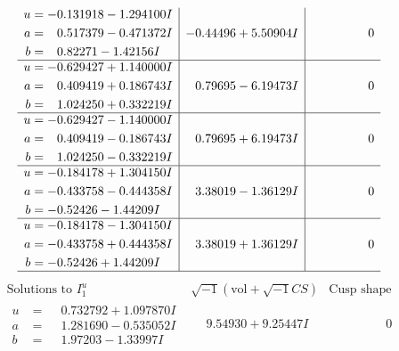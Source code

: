 \documentclass[1p]{elsarticle_modified}
\theoremstyle{definition}
\newcommand{\I}{\sqrt{-1}}
\begin{document}
$$\begin{array}{c|c|c}
\begin{aligned}
u &= -0.131918 - 1.294100 I \\
a &= \phantom{-}0.517379 - 0.471372 I \\
b &= \phantom{-}0.82271 - 1.42156 I\end{aligned}
 & -0.44496 + 5.50904 I & \phantom{-0.000000 } 0 \\ \hline\begin{aligned}
u &= -0.629427 + 1.140000 I \\
a &= \phantom{-}0.409419 + 0.186743 I \\
b &= \phantom{-}1.024250 + 0.332219 I\end{aligned}
 & \phantom{-}0.79695 - 6.19473 I & \phantom{-0.000000 } 0 \\ \hline\begin{aligned}
u &= -0.629427 - 1.140000 I \\
a &= \phantom{-}0.409419 - 0.186743 I \\
b &= \phantom{-}1.024250 - 0.332219 I\end{aligned}
 & \phantom{-}0.79695 + 6.19473 I & \phantom{-0.000000 } 0 \\ \hline\begin{aligned}
u &= -0.184178 + 1.304150 I \\
a &= -0.433758 - 0.444358 I \\
b &= -0.52426 - 1.44209 I\end{aligned}
 & \phantom{-}3.38019 - 1.36129 I & \phantom{-0.000000 } 0 \\ \hline\begin{aligned}
u &= -0.184178 - 1.304150 I \\
a &= -0.433758 + 0.444358 I \\
b &= -0.52426 + 1.44209 I\end{aligned}
 & \phantom{-}3.38019 + 1.36129 I & \phantom{-0.000000 } 0\\
 \hline 
 \end{array}$$\newpage$$\begin{array}{c|c|c}  
\text{Solutions to }I^u_{1}& \I (\text{vol} + \sqrt{-1}CS) & \text{Cusp shape}\\
 \hline 
\begin{aligned}
u &= \phantom{-}0.732792 + 1.097870 I \\
a &= \phantom{-}1.281690 - 0.535052 I \\
b &= \phantom{-}1.97203 - 1.33997 I\end{aligned}
 & \phantom{-}9.54930 + 9.25447 I & \phantom{-0.000000 } 0 \\ \hline\begin{aligned}

\end{aligned}
\end{array}$$
\end{document}
